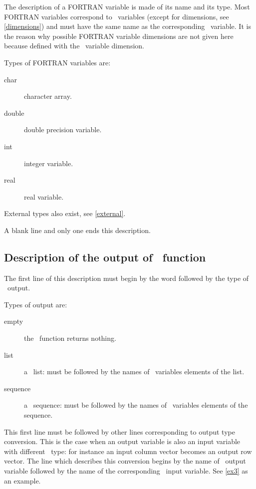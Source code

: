 The description of a FORTRAN variable is made of its name and its type.
Most FORTRAN variables correspond to \SCI\ variables (except for
dimensions, see \ref{dimensions}) and must have the same name as the
corresponding \SCI\ variable. It is the reason why possible FORTRAN variable
dimensions are not given here because defined with the \SCI\ variable
dimension.

\smallskip

Types of FORTRAN variables are:
\begin{description}
  \item[char] character array.
  \item[double] double precision variable.
  \item[int] integer variable.
  \item[real] real variable.
\end{description}

External types also exist, see \ref{external}.

\smallskip

A blank line and only one ends this description.

\subsection{Description of the output of \SCI\ function}
\label{output}

The first line of this description must begin by the word  followed
by the type of \SCI\ output.

\smallskip

Types of output are:
\begin{description}
  \item[empty] the \SCI\ function returns nothing.
  \item[list] a \SCI\ list: must be followed by the names of \SCI\ variables
elements of the list.
  \item[sequence] a \SCI\ sequence: must be followed by the names of \SCI\
variables elements of the sequence.
\end{description}

This first line must be followed by other lines corresponding to output type
conversion. This is the case when an output variable is also an input variable
with different \SCI\ type: for instance an input column vector becomes an
output row vector. The line which describes this conversion begins by the name
of \SCI\ output variable followed by the name of the corresponding \SCI\ input
variable. See \ref{ex3} as an example.
\medskip


